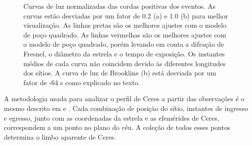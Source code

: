 \documentclass[12pt,a4paper]{monografia}
\begin{document}
\begin{figure}[h]
\begin{centering}
\caption{Curvas de luz normalizadas das cordas positivas dos eventos. As curvas estão desviadas por um fator de 0.2 (a) e 1.0 (b) para melhor visualização. As linhas pretas são os melhores ajustes com o modelo de poço quadrado. As linhas vermelhas são os melhores ajustes com o modelo de poço quadrado, porém levando em conta a difração de Fresnel, o diâmetro da estrela e o tempo de exposição. Os instantes médios de cada curva não coincidem devido às diferentes longitudes dos sítios. A curva de luz de Brookline (b) está desviada por um fator de -64 s como explicado no texto.
\label{Fig: Ceres-curves}}
\end{centering}
\end{figure}

A metodologia usada para analizar o perfil de Ceres a partir das observações é o mesmo descrito em \cite{Sicardy2011} e \cite{Braga-Ribas2013}. Cada combinação de posição do sítio, instantes de ingresso e egresso, junto com as coordenadas da estrela e as efemérides de Ceres, correspondem a um ponto no plano do céu. A coleção de todos esses pontos determina o limbo aparente de Ceres.
\end{document}
